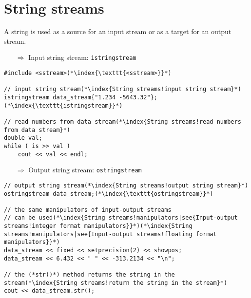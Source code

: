 \documentclass[10pt]{article}
\begin{document}
\section{String streams}
\small
A string is used as a source for an input stream or as a target for an output stream. \\
\begin{enumerate}
\item[$\Rightarrow$] Input string stream: \texttt{istringstream}
\end{enumerate}
\begin{lstlisting}
#include <sstream>(*\index{\texttt{<sstream>}}*)

// input string stream(*\index{String streams!input string stream}*)
istringstream data_stream{"1.234 -5643.32"};(*\index{\texttt{istringstream}}*)

// read numbers from data stream(*\index{String streams!read numbers from data stream}*)
double val;
while ( is >> val )
    cout << val << endl;
\end{lstlisting}
\begin{enumerate}
\item[$\Rightarrow$] Output string stream: \texttt{ostringstream}
\end{enumerate}
\begin{lstlisting}
// output string stream(*\index{String streams!output string stream}*)
ostringstream data_stream;(*\index{\texttt{ostringstream}}*)

// the same manipulators of input-output streams
// can be used(*\index{String streams!manipulators|see{Input-output streams!integer format manipulators}}*)(*\index{String streams!manipulators|see{Input-output streams!floating format manipulators}}*)
data_stream << fixed << setprecision(2) << showpos;
data_stream << 6.432 << " " << -313.2134 << "\n";

// the (*str()*) method returns the string in the stream(*\index{String streams!return the string in the stream}*)
cout << data_stream.str();
\end{lstlisting}
%
%
\end{document}
